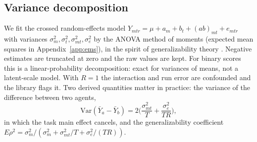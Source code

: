 \subsection{Variance decomposition}
We fit the crossed random-effects model $Y_{mtr}=\mu+a_m+b_t+(ab)_{mt}+e_{mtr}$ with variances $\sigma^2_m,\sigma^2_t,\sigma^2_{mt},\sigma^2_e$ by the ANOVA method of moments (expected mean squares in Appendix~\ref{app:ems}), in the spirit of generalizability theory \citep{cronbach1972,brennan2001}. Negative estimates are truncated at zero and the raw values are kept. For binary scores this is a linear-probability decomposition: exact for variances of means, not a latent-scale model. With $R=1$ the interaction and run error are confounded and the library flags it. Two derived quantities matter in practice: the variance of the difference between two agents,
\begin{equation}
\mathrm{Var}(\bar Y_a-\bar Y_b)=2\Big(\frac{\sigma^2_{mt}}{T}+\frac{\sigma^2_e}{TR}\Big),
\end{equation}
in which the task main effect cancels, and the generalizability coefficient $E\rho^2=\sigma^2_m/(\sigma^2_m+\sigma^2_{mt}/T+\sigma^2_e/(TR))$.


